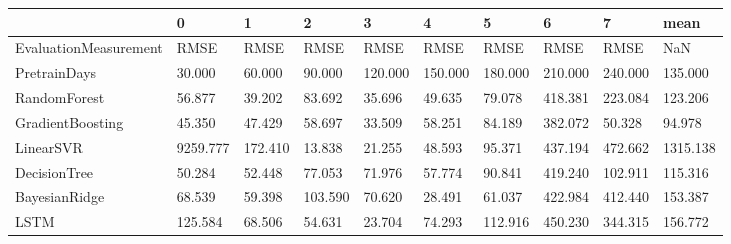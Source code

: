 \begin{tabular}{llllllllll}
\toprule
{} &        0 &       1 &       2 &       3 &       4 &       5 &       6 &       7 &     mean \\
\midrule
EvaluationMeasurement &     RMSE &    RMSE &    RMSE &    RMSE &    RMSE &    RMSE &    RMSE &    RMSE &      NaN \\
PretrainDays          &   30.000 &  60.000 &  90.000 & 120.000 & 150.000 & 180.000 & 210.000 & 240.000 &  135.000 \\
RandomForest          &   56.877 &  39.202 &  83.692 &  35.696 &  49.635 &  79.078 & 418.381 & 223.084 &  123.206 \\
GradientBoosting      &   45.350 &  47.429 &  58.697 &  33.509 &  58.251 &  84.189 & 382.072 &  50.328 &   94.978 \\
LinearSVR             & 9259.777 & 172.410 &  13.838 &  21.255 &  48.593 &  95.371 & 437.194 & 472.662 & 1315.138 \\
DecisionTree          &   50.284 &  52.448 &  77.053 &  71.976 &  57.774 &  90.841 & 419.240 & 102.911 &  115.316 \\
BayesianRidge         &   68.539 &  59.398 & 103.590 &  70.620 &  28.491 &  61.037 & 422.984 & 412.440 &  153.387 \\
LSTM                  &  125.584 &  68.506 &  54.631 &  23.704 &  74.293 & 112.916 & 450.230 & 344.315 &  156.772 \\
\bottomrule
\end{tabular}
